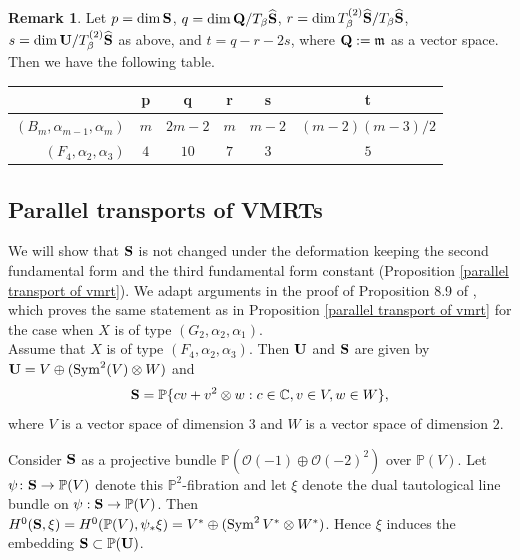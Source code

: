 \documentclass[12pt]{amsart}
\theoremstyle{plain}
\theoremstyle{definition}
\newtheorem{remark}[theorem]{Remark}
\def\Sym{\operatorname{Sym}}
\begin{document}
\begin{remark}\label{pqrst}
Let $p=\dim {\bf S}$, $q=\dim {\bf Q}/  T_{\beta}\widehat{\bf S}$, $r=\dim T^{(2)}_{\beta}\widehat{\bf S}/T_{\beta}\widehat{\bf S}$, $s=\dim {\bf U}/T^{(2)}_{\beta}\widehat{\bf S}$ as above, and $t=q-r-2s$, where ${\bf Q}:= \mathfrak{m}$ as a vector space. Then we have the following table.

\begin{center}
    \begin{tabular}{ r | c c c c c }
 & p & q & r & s & t\\
 \hline
$(B_m, \alpha_{m-1}, \alpha_{m})$ &$m$&$2m-2$&$m$&$m-2$&${(m-2)(m-3)}/{2}$ \\
$(F_{4}, \alpha_{2}, \alpha_{3})$ &$4$&$10$&$7$&$3$&$5$ \\
    \end{tabular}
\end{center}

\end{remark}


\subsection{Parallel transports of VMRTs}
We will show that ${\bf S}$ is not changed under the deformation keeping the second fundamental form and the third fundamental form constant (Proposition \ref{parallel transport of vmrt}).
We adapt arguments in the proof of  Proposition 8.9 of \cite{Hw15}, which proves the same statement as in Proposition \ref{parallel transport of vmrt}  for the case when $X$ is of type $(G_2, \alpha_2,\alpha_1)$. \\

Assume that  $X$ is of type $(F_4, \alpha_2, \alpha_3)$.
Then ${\bf U}$ and ${\bf S}$ are given by   %
  ${\bf U} = V \oplus (\Sym^2(V) \otimes W)$ and
\begin{eqnarray*}{\bf S}=\mathbb P \{ c v + v^2 \otimes w: c \in \mathbb C, v \in V, w \in W\},
\end{eqnarray*}
where  $V$ is a vector space of dimension   $3$ and $W$ is a vector space of dimension  $2$.

Consider ${\bf S}$ as a projective bundle $\mathbb P(\mathcal O(-1) \oplus \mathcal O(-2)^2)$ over $\mathbb P(V) $. Let $\psi \colon {\bf S}  \rightarrow \mathbb P(V) $ denote this $\mathbb P^2$-fibration and
let $\xi$ denote the dual tautological line bundle on $\psi:{\bf S} \rightarrow \mathbb P(V)$. Then $H^0({\bf S}, \xi) = H^0(\mathbb P(V), \psi_*\xi) =V^* \oplus (\Sym^2 V ^*\otimes W^*)$. Hence $\xi$ induces the embedding ${\bf S} \subset \mathbb P({\bf U})$.
\end{document}
